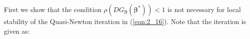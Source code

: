 \begin{appendix}



First we show that the condition $\rho(DG_{\pmb{\beta}}(\pmb{\beta}^{*}))<1$ is not necessary for local stability of the Quasi-Newton iteration in (\ref{eqn:2_16}). Note that the iteration is given as: 


\end{appendix}
